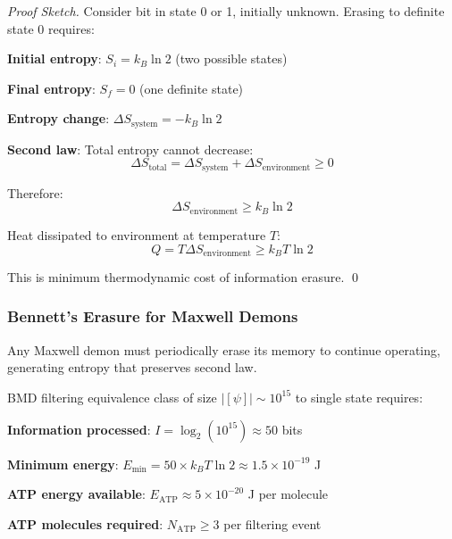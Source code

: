 \documentclass[11pt,onecolumn]{article}
\begin{document}
\begin{proof}[Proof Sketch]
Consider bit in state 0 or 1, initially unknown. Erasing to definite state 0 requires:

\textbf{Initial entropy}: $S_i = k_B \ln 2$ (two possible states)

\textbf{Final entropy}: $S_f = 0$ (one definite state)

\textbf{Entropy change}: $\Delta S_{\text{system}} = -k_B \ln 2$

\textbf{Second law}: Total entropy cannot decrease:
\begin{equation}
\Delta S_{\text{total}} = \Delta S_{\text{system}} + \Delta S_{\text{environment}} \geq 0
\end{equation}

Therefore:
\begin{equation}
\Delta S_{\text{environment}} \geq k_B \ln 2
\end{equation}

Heat dissipated to environment at temperature $T$:
\begin{equation}
Q = T \Delta S_{\text{environment}} \geq k_B T \ln 2
\end{equation}

This is minimum thermodynamic cost of information erasure. \qed
\end{proof}

\subsubsection{Bennett's Erasure for Maxwell Demons}

\begin{theorem}
Any Maxwell demon must periodically erase its memory to continue operating, generating entropy that preserves second law.
\end{theorem}

BMD filtering equivalence class of size $|[\psi]| \sim 10^{15}$ to single state requires:

\textbf{Information processed}: $I = \log_2(10^{15}) \approx 50$ bits

\textbf{Minimum energy}: $E_{\text{min}} = 50 \times k_B T \ln 2 \approx 1.5 \times 10^{-19}$ J

\textbf{ATP energy available}: $E_{\text{ATP}} \approx 5 \times 10^{-20}$ J per molecule

\textbf{ATP molecules required}: $N_{\text{ATP}} \geq 3$ per filtering event
\end{document}
